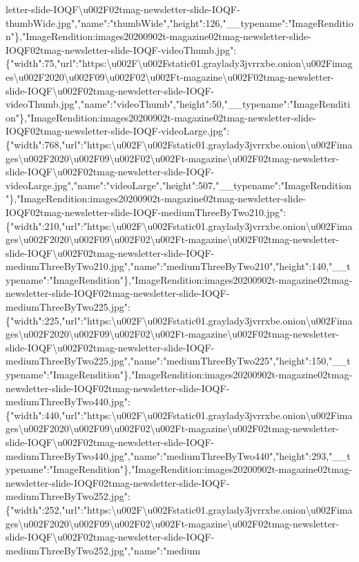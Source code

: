 letter-slide-IOQF\textbackslash{}u002F02tmag-newsletter-slide-IOQF-thumbWide.jpg","name":"thumbWide","height":126,"\_\_typename":"ImageRendition"\},"ImageRendition:images20200902t-magazine02tmag-newsletter-slide-IOQF02tmag-newsletter-slide-IOQF-videoThumb.jpg":\{"width":75,"url":"https:\textbackslash{}u002F\textbackslash{}u002Fstatic01.graylady3jvrrxbe.onion\textbackslash{}u002Fimages\textbackslash{}u002F2020\textbackslash{}u002F09\textbackslash{}u002F02\textbackslash{}u002Ft-magazine\textbackslash{}u002F02tmag-newsletter-slide-IOQF\textbackslash{}u002F02tmag-newsletter-slide-IOQF-videoThumb.jpg","name":"videoThumb","height":50,"\_\_typename":"ImageRendition"\},"ImageRendition:images20200902t-magazine02tmag-newsletter-slide-IOQF02tmag-newsletter-slide-IOQF-videoLarge.jpg":\{"width":768,"url":"https:\textbackslash{}u002F\textbackslash{}u002Fstatic01.graylady3jvrrxbe.onion\textbackslash{}u002Fimages\textbackslash{}u002F2020\textbackslash{}u002F09\textbackslash{}u002F02\textbackslash{}u002Ft-magazine\textbackslash{}u002F02tmag-newsletter-slide-IOQF\textbackslash{}u002F02tmag-newsletter-slide-IOQF-videoLarge.jpg","name":"videoLarge","height":507,"\_\_typename":"ImageRendition"\},"ImageRendition:images20200902t-magazine02tmag-newsletter-slide-IOQF02tmag-newsletter-slide-IOQF-mediumThreeByTwo210.jpg":\{"width":210,"url":"https:\textbackslash{}u002F\textbackslash{}u002Fstatic01.graylady3jvrrxbe.onion\textbackslash{}u002Fimages\textbackslash{}u002F2020\textbackslash{}u002F09\textbackslash{}u002F02\textbackslash{}u002Ft-magazine\textbackslash{}u002F02tmag-newsletter-slide-IOQF\textbackslash{}u002F02tmag-newsletter-slide-IOQF-mediumThreeByTwo210.jpg","name":"mediumThreeByTwo210","height":140,"\_\_typename":"ImageRendition"\},"ImageRendition:images20200902t-magazine02tmag-newsletter-slide-IOQF02tmag-newsletter-slide-IOQF-mediumThreeByTwo225.jpg":\{"width":225,"url":"https:\textbackslash{}u002F\textbackslash{}u002Fstatic01.graylady3jvrrxbe.onion\textbackslash{}u002Fimages\textbackslash{}u002F2020\textbackslash{}u002F09\textbackslash{}u002F02\textbackslash{}u002Ft-magazine\textbackslash{}u002F02tmag-newsletter-slide-IOQF\textbackslash{}u002F02tmag-newsletter-slide-IOQF-mediumThreeByTwo225.jpg","name":"mediumThreeByTwo225","height":150,"\_\_typename":"ImageRendition"\},"ImageRendition:images20200902t-magazine02tmag-newsletter-slide-IOQF02tmag-newsletter-slide-IOQF-mediumThreeByTwo440.jpg":\{"width":440,"url":"https:\textbackslash{}u002F\textbackslash{}u002Fstatic01.graylady3jvrrxbe.onion\textbackslash{}u002Fimages\textbackslash{}u002F2020\textbackslash{}u002F09\textbackslash{}u002F02\textbackslash{}u002Ft-magazine\textbackslash{}u002F02tmag-newsletter-slide-IOQF\textbackslash{}u002F02tmag-newsletter-slide-IOQF-mediumThreeByTwo440.jpg","name":"mediumThreeByTwo440","height":293,"\_\_typename":"ImageRendition"\},"ImageRendition:images20200902t-magazine02tmag-newsletter-slide-IOQF02tmag-newsletter-slide-IOQF-mediumThreeByTwo252.jpg":\{"width":252,"url":"https:\textbackslash{}u002F\textbackslash{}u002Fstatic01.graylady3jvrrxbe.onion\textbackslash{}u002Fimages\textbackslash{}u002F2020\textbackslash{}u002F09\textbackslash{}u002F02\textbackslash{}u002Ft-magazine\textbackslash{}u002F02tmag-newsletter-slide-IOQF\textbackslash{}u002F02tmag-newsletter-slide-IOQF-mediumThreeByTwo252.jpg","name":"medium
